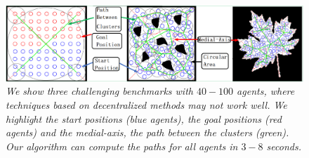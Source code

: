   
 
%
\begin{figure}[!ht]
\centering
\includegraphics[width=\linewidth]{figs/benchmark.png}
\caption{\em We show three challenging benchmarks with $40-100$ agents, where techniques based on decentralized methods may not work well. We highlight the start positions (blue agents), the goal positions (red agents) and the medial-axis, the path between the clusters (green). Our algorithm can compute the paths for all agents in $3-8$ seconds.}
\vspace*{-0.3in}
\label{fig:benchmarks}
\end{figure}





